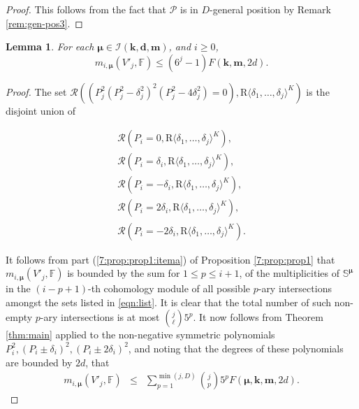 \documentclass{amsart}
\newtheorem{lemma}{Lemma}
\theoremstyle{definition}
\theoremstyle{remark}
\numberwithin{equation}{section}
\begin{document}
\begin{proof}
This follows from the fact that $\mathcal{P}$ is in
$D$-general position by Remark
\ref{rem:gen-pos3}.
\end{proof}

\begin{lemma}
  \label{7:lem:union2} For each $\pmb{\mu}  \in 
\mathcal{I}({\mathbf{k}},{\mathbf{d}},{\mathbf{m}})$, and $i \geq 0$,
\[ m_{i,\pmb{\mu}} (V'_{j},{\mathbb{F}}) \leq (6^{j} -1) F (
     \mathbf{k},{\mathbf{m}},2d) . 
\]
\end{lemma}

\begin{proof}

The set ${{\mathcal R}} ((P_{j}^{2} (P_{j}^{2} - \delta_{j}^{2}
)^{2} (P_{j}^{2} -4 \delta_{j}^{2})=0), {\mathrm{R}} {{\langle}} \delta_{1} , \ldots ,
\delta_{j} {{\rangle}}^{K})$ is the disjoint union of

\begin{equation}
 \begin{array}{c}
     {{\mathcal R}} (P_{i} =0, {\mathrm{R}} {{\langle}} \delta_{1} , \ldots , \delta_{j} {{\rangle}}^{K}) ,\\
     {{\mathcal R}} (P_{i} = \delta_{i} , {\mathrm{R}} {{\langle}} \delta_{1} , \ldots , \delta_{j} {{\rangle}}^{K}
    ) ,\\
     {{\mathcal R}} (P_{i} =  -\delta_{i} , {\mathrm{R}} {{\langle}} \delta_{1} , \ldots , \delta_{j}
     {{\rangle}}^{K}) ,\\
     {{\mathcal R}} (P_{i} =2 \delta_{i} , {\mathrm{R}} {{\langle}} \delta_{1} , \ldots , \delta_{j}
     {{\rangle}}^{K}) ,\\
     {{\mathcal R}} (P_{i} =  -2 \delta_{i} , {\mathrm{R}} {{\langle}} \delta_{1} , \ldots , \delta_{j}
     {{\rangle}}^{K}) .
   \end{array} \label{eqn:list}
\end{equation}

It follows from part (\ref{7:prop:prop1:itema}) of Proposition \ref{7:prop:prop1}  
that $m_{i,\pmb{\mu}} (V'_{j} ,{\mathbb{F}})$ 
is bounded by the sum for 
$1 \leq p \leq i+1$, of the multiplicities of  $\mathbb{S}^{\pmb{\mu}}$
in the $(i- p +1)$-th cohomology module of all possible $p$-ary
intersections  amongst the sets listed in \eqref{eqn:list}. It is clear that
the total number of such non-empty $p$-ary intersections is at most
$\binom{j}{\ell} 5^{p}$. It now follows from Theorem \ref{thm:main} applied
to the non-negative symmetric polynomials $P_{i}^{2} , (P_{i} \pm
\delta_{i})^{2} , (P_{i} \pm 2 \delta_{i})^{2}$, and noting that the
degrees of these polynomials are bounded by $2d$, that
\begin{eqnarray*}
  m_{i, \pmb{\mu}} (V'_{j},{\mathbb{F}}) 
  & \leq & 
  \sum_{p=1}^{\min (j,D)} \binom{j}{p} 5^{p} F (\pmb{\mu}, \mathbf{k},{\mathbf{m}},2d) .
\end{eqnarray*}
\end{proof}
\end{document}
